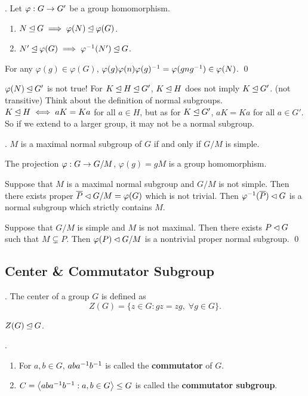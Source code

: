 \prop. Let \(\varphi : G \rightarrow G'\) be a group homomorphism.
\begin{enumerate}
    \item \(N \unlhd G \implies \varphi(N) \unlhd \varphi(G)\).
    \item \(N' \unlhd \varphi(G) \implies \varphi^{-1}(N') \unlhd G\).
\end{enumerate}

\pf For any \(\varphi(g) \in \varphi(G)\), \(\varphi(g) \varphi(n) \varphi(g)^{-1} = \varphi(gng^{-1}) \in \varphi(N)\). \qed

\rmk \(\varphi(N) \unlhd G'\) is not true! For \(K \unlhd H \unlhd G'\), \(K \unlhd H\) does not imply \(K \unlhd G'\). (not transitive) Think about the definition of normal subgroups. \(K \unlhd H \iff aK = Ka\) for all \(a \in H\), but as for \(K \unlhd G'\), \(aK = Ka\) for all \(a \in G'\). So if we extend to a larger group, it may not be a normal subgroup.

\thm. \(M\) is a maximal normal subgroup of \(G\) if and only if \(G/M\) is simple.

\pf The projection \(\varphi: G \rightarrow G/M\), \(\varphi(g) = gM\) is a group homomorphism.

\note{\mimp} Suppose that \(M\) is a maximal normal subgroup and \(G/M\) is not simple. Then there exists proper \(\bar{P} \pnsub G/M = \varphi(G)\) which is not trivial. Then \(\varphi\inv(\bar{P}) \pnsub G\) is a normal subgroup which strictly contains \(M\).

\note{\mimpd} Suppose that \(G/M\) is simple and \(M\) is not maximal. Then there exists \(P \lhd G\) such that \(M \subsetneq P\). Then \(\varphi(P) \lhd G/M\) is a nontrivial proper normal subgroup. \qed

\subsection*{Center \& Commutator Subgroup}

.  The center of a group \(G\) is defined as
\[
    Z(G) = \{z \in G : gz = zg,\; \forall g \in G\}.
\]

\rmk \(Z(G) \unlhd G\).

. 
\begin{enumerate}
    \item For \(a, b \in G\), \(aba^{-1} b^{-1}\) is called the \textbf{commutator} of \(G\).
    \item \(C = \left\langle aba^{-1} b^{-1} : a, b \in G \right\rangle \leq G\) is called the \textbf{commutator subgroup}.
\end{enumerate}

